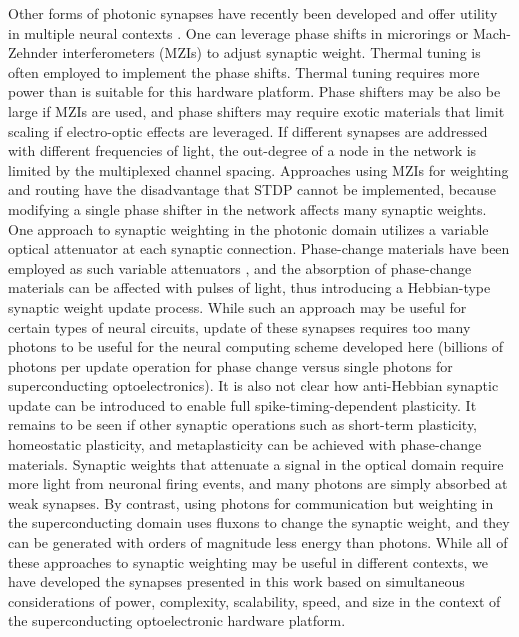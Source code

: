 \documentclass[twocolumn]{article}
\begin{document}
Other forms of photonic synapses have recently been developed and offer utility in multiple neural contexts \cite{prsh2017,tana20142,tafe2017,shha2016,chri2017,humi2018}. One can leverage phase shifts in microrings \cite{tana20142,tafe2017} or Mach-Zehnder interferometers (MZIs) \cite{shha2016} to adjust synaptic weight. Thermal tuning is often employed to implement the phase shifts. Thermal tuning requires more power than is suitable for this hardware platform. Phase shifters may be also be large if MZIs are used, and phase shifters may require exotic materials that limit scaling if electro-optic effects are leveraged. If different synapses are addressed with different frequencies of light, the out-degree of a node in the network is limited by the multiplexed channel spacing. Approaches using MZIs for weighting and routing have the disadvantage that STDP cannot be implemented, because modifying a single phase shifter in the network affects many synaptic weights. One approach to synaptic weighting in the photonic domain utilizes a variable optical attenuator at each synaptic connection. Phase-change materials have been employed as such variable attenuators \cite{chri2017}, and the absorption of phase-change materials can be affected with pulses of light, thus introducing a Hebbian-type synaptic weight update process. While such an approach may be useful for certain types of neural circuits, update of these synapses requires too many photons to be useful for the neural computing scheme developed here (billions of photons per update operation for phase change versus single photons for superconducting optoelectronics). It is also not clear how anti-Hebbian synaptic update can be introduced to enable full spike-timing-dependent plasticity. It remains to be seen if other synaptic operations such as short-term plasticity, homeostatic plasticity, and metaplasticity can be achieved with phase-change materials. Synaptic weights that attenuate a signal in the optical domain require more light from neuronal firing events, and many photons are simply absorbed at weak synapses. By contrast, using photons for communication but weighting in the superconducting domain uses fluxons to change the synaptic weight, and they can be generated with orders of magnitude less energy than photons. While all of these approaches to synaptic weighting may be useful in different contexts, we have developed the synapses presented in this work based on simultaneous considerations of power, complexity, scalability, speed, and size in the context of the superconducting optoelectronic hardware platform.
\end{document}
